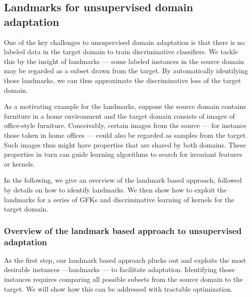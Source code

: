 


\subsection{Landmarks for unsupervised domain adaptation}  \label{sLandmark}
One of the key challenges to unsupervised domain adaptation is that there is no labeled data in the target domain to train discriminative classifiers. We tackle this by the insight of landmarks --- some labeled instances in the source domain may be regarded as a subset drawn from the target. By automatically identifying those landmarks, we can thus approximate the discriminative loss of the target domain. 

As a motivating example for the landmarks, suppose the source domain contains furniture in a home environment  and the target domain consists of images of office-style furniture.  Conceivably, certain images from the source --- for instance those taken in home offices --- could also be regarded as samples from the target. Such images thus might have properties that are shared by both domains. These properties in turn can guide learning algorithms to search for invariant features or kernels.



In the following, we give an overview of the landmark based approach, followed by details on how to identify landmarks. We then show how to exploit the landmarks for a series of GFKs and discriminative learning of kernels for the target domain.

\subsubsection{Overview of the landmark based approach to unsupervised adaptation}
As the first step, our landmark based approach plucks out and exploits the most desirable instances ---landmarks --- to facilitate adaptation. Identifying those instances requires comparing all possible subsets from the source domain to the target. We will show how this can be addressed with tractable optimization.

